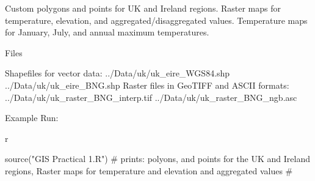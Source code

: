    Custom polygons and points for UK and Ireland regions.
    Raster maps for temperature, elevation, and aggregated/disaggregated values.
    Temperature maps for January, July, and annual maximum temperatures.

Files

    Shapefiles for vector data:
        ../Data/uk/uk_eire_WGS84.shp
        ../Data/uk/uk_eire_BNG.shp
    Raster files in GeoTIFF and ASCII formats:
        ../Data/uk/uk_raster_BNG_interp.tif
        ../Data/uk/uk_raster_BNG_ngb.asc

Example Run:

    r

    source("GIS Practical 1.R")
    # prints: polyons, and points for the UK and Ireland regions, Raster maps for temperature and elevation and aggregated values 
    # 